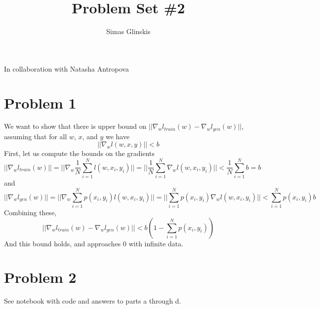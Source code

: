 \documentclass[]{article}
\title{Problem Set \#2}
\author{Simas Glinskis}
\begin{document}
\maketitle
In collaboration with Natasha Antropova 


\section*{Problem 1}
We want to show that there is upper bound on $||\nabla_wl_{train}(w)-\nabla_wl_{gen}(w)||$, assuming that for all $w$, $x$, and $y$ we have
\[
||\nabla_w l(w,x,y)|| < b
\]
First, let us compute the bounds on the gradients
\[
||\nabla_wl_{train}(w)|| = ||\nabla_w\frac{1}{N}\sum_{i=1}^{N}l(w,x_i,y_i)||=||\frac{1}{N}\sum_{i=1}^{N}\nabla_wl(w,x_i,y_i)||<\frac{1}{N}\sum_{i=1}^{N}b=b
\] 
and
\[
||\nabla_wl_{gen}(w)|| = ||\nabla_w\sum_{i=1}^{N}p(x_i,y_i)l(w,x_i,y_i)||=||\sum_{i=1}^{N}p(x_i,y_i)\nabla_wl(w,x_i,y_i)||<\sum_{i=1}^{N}p(x_i,y_i)b
\]
Combining these,
\[
||\nabla_wl_{train}(w)-\nabla_wl_{gen}(w)|| < b(1-\sum_{i=1}^{N}p(x_i,y_i))
\]
And this bound holds, and approaches 0 with infinite data.

\section*{Problem 2}
See notebook with code and answers to parts a through d.
\end{document}
